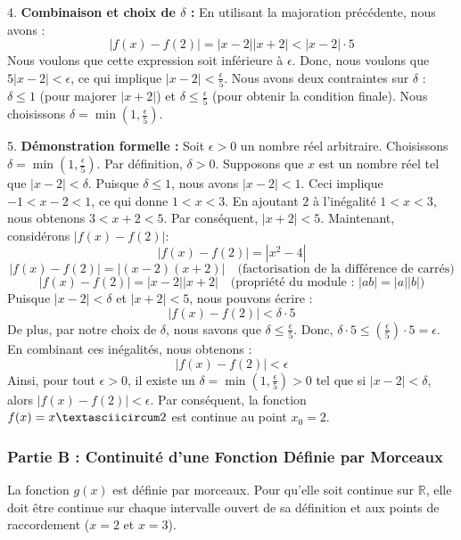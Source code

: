 \documentclass[12pt,a4paper]{report}
\begin{document}
4.  \textbf{Combinaison et choix de $\delta$ :}
    En utilisant la majoration précédente, nous avons :
    $$ |f(x) - f(2)| = |x - 2| |x + 2| < |x - 2| \cdot 5 $$
    Nous voulons que cette expression soit inférieure à $\epsilon$. Donc, nous voulons que $5|x - 2| < \epsilon$, ce qui implique $|x - 2| < \frac{\epsilon}{5}$.
    Nous avons deux contraintes sur $\delta$ : $\delta \le 1$ (pour majorer $|x+2|$) et $\delta \le \frac{\epsilon}{5}$ (pour obtenir la condition finale).
    Nous choisissons $\delta = \min\left(1, \frac{\epsilon}{5}\right)$.

5.  \textbf{Démonstration formelle :}
    Soit $\epsilon > 0$ un nombre réel arbitraire.
    Choisissons $\delta = \min\left(1, \frac{\epsilon}{5}\right)$. Par définition, $\delta > 0$.
    Supposons que $x$ est un nombre réel tel que $|x - 2| < \delta$.
    Puisque $\delta \le 1$, nous avons $|x - 2| < 1$.
    Ceci implique $-1 < x - 2 < 1$, ce qui donne $1 < x < 3$.
    En ajoutant $2$ à l'inégalité $1 < x < 3$, nous obtenons $3 < x + 2 < 5$.
    Par conséquent, $|x + 2| < 5$.
    Maintenant, considérons $|f(x) - f(2)|$:
    $$ |f(x) - f(2)| = |x^2 - 4| $$
    $$ |f(x) - f(2)| = |(x - 2)(x + 2)| \quad \text{(factorisation de la différence de carrés)} $$
    $$ |f(x) - f(2)| = |x - 2| |x + 2| \quad \text{(propriété du module : } |ab| = |a||b|) $$
    Puisque $|x - 2| < \delta$ et $|x + 2| < 5$, nous pouvons écrire :
    $$ |f(x) - f(2)| < \delta \cdot 5 $$
    De plus, par notre choix de $\delta$, nous savons que $\delta \le \frac{\epsilon}{5}$.
    Donc, $\delta \cdot 5 \le \left(\frac{\epsilon}{5}\right) \cdot 5 = \epsilon$.
    En combinant ces inégalités, nous obtenons :
    $$ |f(x) - f(2)| < \epsilon $$
    Ainsi, pour tout $\epsilon > 0$, il existe un $\delta = \min\left(1, \frac{\epsilon}{5}\right) > 0$ tel que si $|x - 2| < \delta$, alors $|f(x) - f(2)| < \epsilon$.
    Par conséquent, la fonction $f(x) = x\textasciicircum 2$ est continue au point $x_0 = 2$.

\subsubsection{Partie B : Continuité d'une Fonction Définie par Morceaux}

La fonction $g(x)$ est définie par morceaux. Pour qu'elle soit continue sur $\mathbb{R}$, elle doit être continue sur chaque intervalle ouvert de sa définition et aux points de raccordement ($x=2$ et $x=3$).
\end{document}
